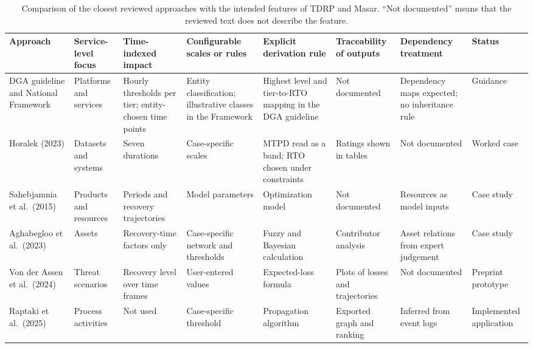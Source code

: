 \begin{table}
\centering
\caption{Comparison of the closest reviewed approaches with the intended features of TDRP and Masar. ``Not documented'' means that the reviewed text does not describe the feature.}
\label{tab:lr_comparison_matrix}
\footnotesize
\renewcommand{\arraystretch}{1.1}
\setlength{\tabcolsep}{4pt}
\begin{tabularx}{\linewidth}{>{\raggedright\arraybackslash}p{3.1cm} >{\raggedright\arraybackslash}X >{\raggedright\arraybackslash}X >{\raggedright\arraybackslash}X >{\raggedright\arraybackslash}X >{\raggedright\arraybackslash}X >{\raggedright\arraybackslash}X >{\raggedright\arraybackslash}X}
\toprule
\textbf{Approach} & \textbf{Service-level focus} & \textbf{Time-indexed impact} & \textbf{Configurable scales or rules} & \textbf{Explicit derivation rule} & \textbf{Traceability of outputs} & \textbf{Dependency treatment} & \textbf{Status} \\
\midrule
DGA guideline and National Framework \cite{dga2025guidelineen,nrcnationalframework} & Platforms and services & Hourly thresholds per tier; entity-chosen time points & Entity classification; illustrative classes in the Framework & Highest level and tier-to-RTO mapping in the DGA guideline & Not documented & Dependency maps expected; no inheritance rule & Guidance \\
Horalek (2023) \cite{amm2023bia} & Datasets and systems & Seven durations & Case-specific scales & MTPD read as a band; RTO chosen under constraints & Ratings shown in tables & Not documented & Worked case \\
Sahebjamnia et al.\ (2015) \cite{sahebjamnia2015integrated} & Products and resources & Periods and recovery trajectories & Model parameters & Optimization model & Not documented & Resources as model inputs & Case study \\
Aghabegloo et al.\ (2023) \cite{assetcriticality2023} & Assets & Recovery-time factors only & Case-specific network and thresholds & Fuzzy and Bayesian calculation & Contributor analysis & Asset relations from expert judgement & Case study \\
Von der Assen et al.\ (2024) \cite{vonderassen2024quanttm} & Threat scenarios & Recovery level over time frames & User-entered values & Expected-loss formula & Plots of losses and trajectories & Not documented & Preprint prototype \\
Raptaki et al.\ (2025) \cite{raptaki2025propagation} & Process activities & Not used & Case-specific threshold & Propagation algorithm & Exported graph and ranking & Inferred from event logs & Implemented application \\

\end{tabularx}
\end{table}
